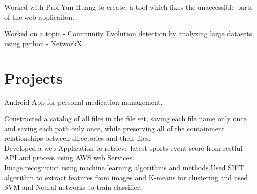 \documentclass[]{deedy-resume-openfont}
\begin{document}
\begin{minipage}[t]{0.66\textwidth}
\begin{tightemize}
\end{tightemize}
\sectionsep


\begin{tightemize}
\item Worked with Prof.Yun Huang to create, a tool which fixes the unaccessible parts of the web applicaiton.
\item Worked on a topic - Community Evolution detection by analyzing large datasets using python - NetworkX
\end{tightemize}


\sectionsep




\section{Projects}



 Android App for personal medication management. \\

Constructed a catalog of all files in the file set, saving each file name only once and saving each path only once, while preserving all of the containment relationships between directories and their files. \\
Developed a web Application to retrieve latest sports event score from restful API and process using AWS web Services.
 \\
 Image recognition using machine learning algorithms and methods.Used SIFT algorithm to extract features from images and K-means for clustering and used SVM and Neural networks to train classifier. \\


\sectionsep

\end{minipage}
\end{document}
